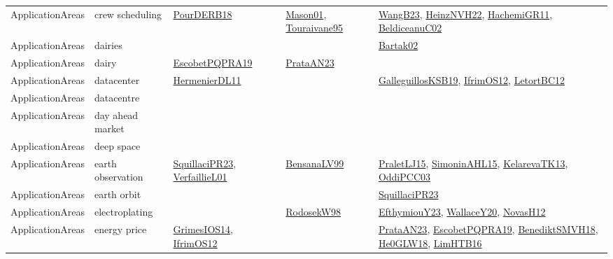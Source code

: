 {\begin{longtable}{llp{6cm}p{6cm}p{6cm}}
ApplicationAreas & crew scheduling & \href{articles/PourDERB18.pdf}{PourDERB18}\cite{PourDERB18} & \href{articles/Mason01.pdf}{Mason01}\cite{Mason01}, \href{papers/Touraivane95.pdf}{Touraivane95}\cite{Touraivane95} & \href{papers/WangB23.pdf}{WangB23}\cite{WangB23}, \href{articles/HeinzNVH22.pdf}{HeinzNVH22}\cite{HeinzNVH22}, \href{articles/HachemiGR11.pdf}{HachemiGR11}\cite{HachemiGR11}, \href{papers/BeldiceanuC02.pdf}{BeldiceanuC02}\cite{BeldiceanuC02}\\
ApplicationAreas & dairies &  &  & \href{papers/Bartak02.pdf}{Bartak02}\cite{Bartak02}\\
ApplicationAreas & dairy & \href{articles/EscobetPQPRA19.pdf}{EscobetPQPRA19}\cite{EscobetPQPRA19} & \href{articles/PrataAN23.pdf}{PrataAN23}\cite{PrataAN23} & \\
ApplicationAreas & datacenter & \href{papers/HermenierDL11.pdf}{HermenierDL11}\cite{HermenierDL11} &  & \href{papers/GalleguillosKSB19.pdf}{GalleguillosKSB19}\cite{GalleguillosKSB19}, \href{papers/IfrimOS12.pdf}{IfrimOS12}\cite{IfrimOS12}, \href{papers/LetortBC12.pdf}{LetortBC12}\cite{LetortBC12}\\
ApplicationAreas & datacentre &  &  & \\
ApplicationAreas & day ahead market &  &  & \\
ApplicationAreas & deep space &  &  & \\
ApplicationAreas & earth observation & \href{papers/SquillaciPR23.pdf}{SquillaciPR23}\cite{SquillaciPR23}, \href{papers/VerfaillieL01.pdf}{VerfaillieL01}\cite{VerfaillieL01} & \href{articles/BensanaLV99.pdf}{BensanaLV99}\cite{BensanaLV99} & \href{papers/PraletLJ15.pdf}{PraletLJ15}\cite{PraletLJ15}, \href{articles/SimoninAHL15.pdf}{SimoninAHL15}\cite{SimoninAHL15}, \href{papers/KelarevaTK13.pdf}{KelarevaTK13}\cite{KelarevaTK13}, \href{papers/OddiPCC03.pdf}{OddiPCC03}\cite{OddiPCC03}\\
ApplicationAreas & earth orbit &  &  & \href{papers/SquillaciPR23.pdf}{SquillaciPR23}\cite{SquillaciPR23}\\
ApplicationAreas & electroplating &  & \href{papers/RodosekW98.pdf}{RodosekW98}\cite{RodosekW98} & \href{papers/EfthymiouY23.pdf}{EfthymiouY23}\cite{EfthymiouY23}, \href{articles/WallaceY20.pdf}{WallaceY20}\cite{WallaceY20}, \href{articles/NovasH12.pdf}{NovasH12}\cite{NovasH12}\\
ApplicationAreas & energy price & \href{articles/GrimesIOS14.pdf}{GrimesIOS14}\cite{GrimesIOS14}, \href{papers/IfrimOS12.pdf}{IfrimOS12}\cite{IfrimOS12} &  & \href{articles/PrataAN23.pdf}{PrataAN23}\cite{PrataAN23}, \href{articles/EscobetPQPRA19.pdf}{EscobetPQPRA19}\cite{EscobetPQPRA19}, \href{papers/BenediktSMVH18.pdf}{BenediktSMVH18}\cite{BenediktSMVH18}, \href{papers/He0GLW18.pdf}{He0GLW18}\cite{He0GLW18}, \href{papers/LimHTB16.pdf}{LimHTB16}\cite{LimHTB16}\\

\end{longtable}}
